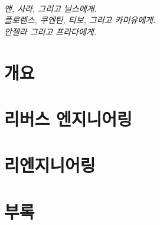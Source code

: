 \documentclass[a4paper,10pt,twoside]{book}
\begin{document}
\vfill
\newpage
~\vfill
\begin{center}
\emph{앤, 사라, 그리고 닐스에게.\\
플로렌스, 쿠엔틴, 티보, 그리고 카미유에게.\\
안젤라 그리고 프라다에게.}
\end{center}
\vfill
\cleardoublepage

\tableofcontents
\sloppy %


\mainmatter
\part{개요}

\part{리버스 엔지니어링}




\part{리엔지니어링}





\appendix
\part{부록}



{\small\raggedright\printindex}
\markboth{}{}
\pagestyle{empty}
\cleardoublepage
~ %
\cleardoublepage
~ %
\cleardoublepage
\end{document}
